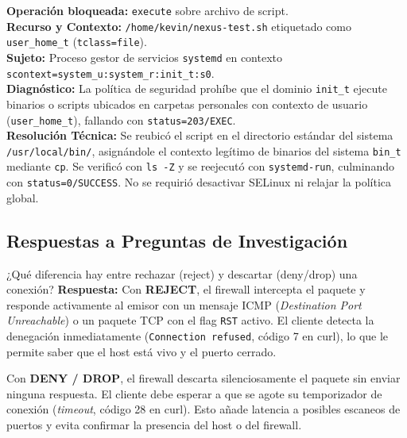 \documentclass[10pt,a4paper]{article}
\begin{document}
\begin{notabox}
    \textbf{Operación bloqueada:} \texttt{execute} sobre archivo de script.\\
    \textbf{Recurso y Contexto:} \texttt{/home/kevin/nexus-test.sh} etiquetado como \texttt{user\_home\_t} (\texttt{tclass=file}).\\
    \textbf{Sujeto:} Proceso gestor de servicios \texttt{systemd} en contexto \texttt{scontext=system\_u:system\_r:init\_t:s0}.\\
    \textbf{Diagnóstico:} La política de seguridad prohíbe que el dominio \texttt{init\_t} ejecute binarios o scripts ubicados en carpetas personales con contexto de usuario (\texttt{user\_home\_t}), fallando con \texttt{status=203/EXEC}.\\
    \textbf{Resolución Técnica:} Se reubicó el script en el directorio estándar del sistema \texttt{/usr/local/bin/}, asignándole el contexto legítimo de binarios del sistema \texttt{bin\_t} mediante \texttt{cp}. Se verificó con \texttt{ls -Z} y se reejecutó con \texttt{systemd-run}, culminando con \texttt{status=0/SUCCESS}. No se requirió desactivar SELinux ni relajar la política global.
\end{notabox}

\subsection{Respuestas a Preguntas de Investigación}

\begin{pregunta}{¿Qué diferencia hay entre rechazar (reject) y descartar (deny/drop) una conexión?}
    \textbf{Respuesta:} Con \textbf{REJECT}, el firewall intercepta el paquete y responde activamente al emisor con un mensaje ICMP (\textit{Destination Port Unreachable}) o un paquete TCP con el flag \texttt{RST} activo. El cliente detecta la denegación inmediatamente (\texttt{Connection refused}, código 7 en curl), lo que le permite saber que el host está vivo y el puerto cerrado.
    
    Con \textbf{DENY / DROP}, el firewall descarta silenciosamente el paquete sin enviar ninguna respuesta. El cliente debe esperar a que se agote su temporizador de conexión (\textit{timeout}, código 28 en curl). Esto añade latencia a posibles escaneos de puertos y evita confirmar la presencia del host o del firewall.
\end{pregunta}
\end{document}
